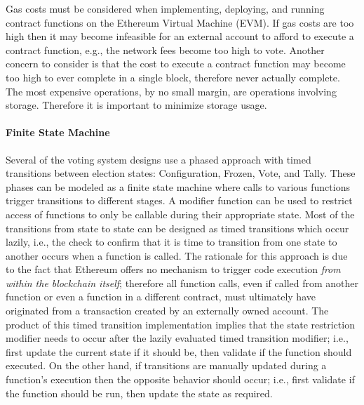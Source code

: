 Gas costs must be considered when implementing, deploying, and running contract
functions on the Ethereum Virtual Machine (EVM). If gas costs are too high then
it may become infeasible for an external account to afford to execute a contract
function, e.g., the network fees become too high to vote. Another concern to
consider is that the cost to execute a contract function may become too high to
ever complete in a single block, therefore never actually complete. The most
expensive operations, by no small margin, are operations involving storage.
Therefore it is important to minimize storage usage.


\paragraph{Finite State Machine}
Several of the voting system designs use a phased approach with timed
transitions between election states: Configuration, Frozen, Vote, and Tally.
These phases can be modeled as a finite state machine where calls to various
functions trigger transitions to different stages. A modifier function can be
used to restrict access of functions to only be callable during their
appropriate state. Most of the transitions from state to state can be designed
as timed transitions which occur lazily, i.e., the check to confirm that it is
time to transition from one state to another occurs when a function is called.
The rationale for this approach is due to the fact that Ethereum offers no
mechanism to trigger code execution \emph{from within the blockchain itself};
therefore all function calls, even if called from another function or even a
function in a different contract, must ultimately have originated from a
transaction created by an externally owned account. The product of this timed
transition implementation implies that the state restriction modifier needs to
occur after the lazily evaluated timed transition modifier; i.e., first update
the current state if it should be, then validate if the function should
executed. On the other hand, if transitions are manually updated during a
function's execution then the opposite behavior should occur; i.e., first
validate if the function should be run, then update the state as required.

